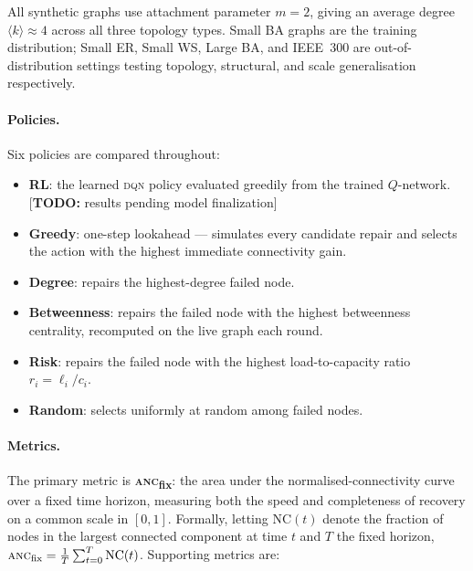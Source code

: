 \documentclass[11pt]{article}
\newcommand{\anc}{\textsc{anc}}
\newcommand{\ancfix}{\anc{}\textsubscript{fix}}
\newcommand{\todo}[1]{\textcolor{red!70!black}{[\textbf{TODO:} #1]}}
\begin{document}
All synthetic graphs use attachment parameter $m=2$, giving an average
degree $\langle k\rangle \approx 4$ across all three topology types.
Small BA graphs are the training distribution; Small ER, Small WS, Large
BA, and IEEE~300 are out-of-distribution settings testing topology,
structural, and scale generalisation respectively.

\paragraph{Policies.}
Six policies are compared throughout:
\begin{itemize}
  \item \textbf{RL}: the learned \textsc{dqn} policy evaluated greedily
        from the trained $Q$-network. \todo{results pending model finalization}
  \item \textbf{Greedy}: one-step lookahead — simulates every candidate
        repair and selects the action with the highest immediate connectivity
        gain.
  \item \textbf{Degree}: repairs the highest-degree failed node.
  \item \textbf{Betweenness}: repairs the failed node with the highest
        betweenness centrality, recomputed on the live graph each round.
  \item \textbf{Risk}: repairs the failed node with the highest
        load-to-capacity ratio $r_i = \ell_i / c_i$.
  \item \textbf{Random}: selects uniformly at random among failed nodes.
\end{itemize}

\paragraph{Metrics.}
The primary metric is \textbf{\ancfix}: the area under the
normalised-connectivity curve over a fixed time horizon, measuring both
the speed and completeness of recovery on a common scale in $[0,1]$.
Formally, letting $\mathrm{NC}(t)$ denote the fraction of nodes in the
largest connected component at time $t$ and $T$ the fixed horizon,
$\ancfix = \frac{1}{T}\sum_{t=0}^{T} \mathrm{NC}(t)$.
Supporting metrics are:
\end{document}
